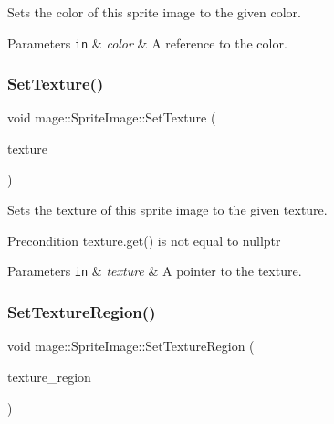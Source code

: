 Sets the color of this sprite image to the given color.


\begin{DoxyParams}[1]{Parameters}
\mbox{\tt in}  & {\em color} & A reference to the color. \\
\hline
\end{DoxyParams}
\hypertarget{classmage_1_1_sprite_image_a9eda532d70317f066cea233445241be1}{}\label{classmage_1_1_sprite_image_a9eda532d70317f066cea233445241be1} 
\subsubsection{\texorpdfstring{Set\+Texture()}{SetTexture()}}
{\footnotesize\ttfamily void mage\+::\+Sprite\+Image\+::\+Set\+Texture (\begin{DoxyParamCaption}\item[{\hyperlink{namespacemage_a1e01ae66713838a7a67d30e44c67703e}{Shared\+Ptr}$<$ const \hyperlink{classmage_1_1_texture}{Texture} $>$}]{texture }\end{DoxyParamCaption})}

Sets the texture of this sprite image to the given texture.

\begin{DoxyPrecond}{Precondition}
{\ttfamily texture.\+get()} is not equal to {\ttfamily nullptr} 
\end{DoxyPrecond}

\begin{DoxyParams}[1]{Parameters}
\mbox{\tt in}  & {\em texture} & A pointer to the texture. \\
\hline
\end{DoxyParams}
\hypertarget{classmage_1_1_sprite_image_a99640fe6fc85d704f6a2831d0f663033}{}\label{classmage_1_1_sprite_image_a99640fe6fc85d704f6a2831d0f663033} 
\subsubsection{\texorpdfstring{Set\+Texture\+Region()}{SetTextureRegion()}}
{\footnotesize\ttfamily void mage\+::\+Sprite\+Image\+::\+Set\+Texture\+Region (\begin{DoxyParamCaption}\item[{const R\+E\+CT \&}]{texture\+\_\+region }\end{DoxyParamCaption})}

